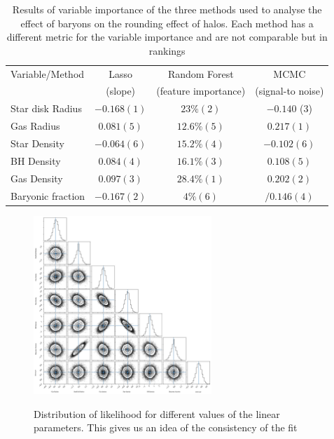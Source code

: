 \documentclass[a4paper,fleqn,usenatbib]{mnras}
\begin{document}
  \begin{table}
\setlength{\tabcolsep}{3pt}
\begin{center}
\begin{tabular}{l|ccc}
 Variable/Method& Lasso& Random Forest & MCMC \\
 & (slope) & (feature importance)&(signal-to noise)\\
\hline 
Star disk Radius &$-0.168 (1)$&$23\% (2)$&$-0.140$  (3)\\[0.1cm]
Gas Radius&$0.081 (5)$&$12.6\% (5)$&$0.217 (1)$\\[0.1cm] 
Star Density &$-0.064 (6)$&$15.2\% (4)$&$-0.102 (6)$\\[0.1cm]
BH Density&$0.084 (4)$&$16.1\% (3)$&$0.108 (5)$\\[0.1cm] 
Gas Density &$0.097 (3)$&$28.4 \%(1)$&$0.202 (2)$\\[0.1cm] 
Baryonic fraction &$-0.167 (2)$&$4\% (6)$&$/0.146 (4)$\\[0.1cm]  
\end{tabular}
\end{center}
\caption{Results of variable importance of the three methods used to analyse
		 the effect of baryons on the rounding effect of halos. Each method has a different
		 metric for the variable importance and are not comparable but in rankings}  
\label{table:sphericity}
\end{table} 
  \begin{figure}
\centering
{\includegraphics[width=0.6\textwidth]{./pics/Sphericity/Sphericity_signal_to_noise.png}}
\caption{Distribution of likelihood for different values of the linear parameters. This gives us an idea of the consistency of the fit } \label{fig:sphericity}
\end{figure}    
\end{document}
